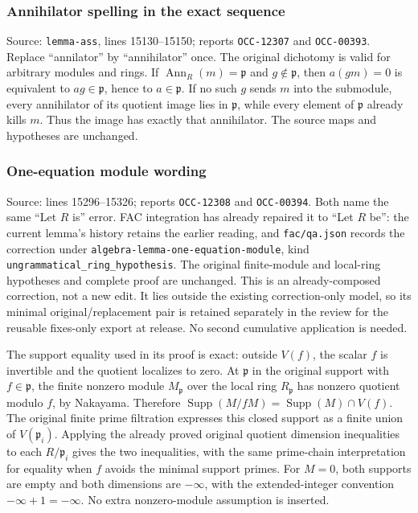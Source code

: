 \subsubsection{Annihilator spelling in the exact sequence}\label{algebra-proof-004-annihilator-spelling-in-the-exact-sequence}

Source: \texttt{lemma-ass}, lines 15130--15150; reports \texttt{OCC-12307} and \texttt{OCC-00393}. Replace ``annilator'' by ``annihilator'' once. The original dichotomy is valid for arbitrary modules and rings. If \(\operatorname{Ann}_R(m)=\mathfrak p\) and \(g\notin\mathfrak p\), then \(a(gm)=0\) is equivalent to \(ag\in\mathfrak p\), hence to \(a\in\mathfrak p\). If no such \(g\) sends \(m\) into the submodule, every annihilator of its quotient image lies in \(\mathfrak p\), while every element of \(\mathfrak p\) already kills \(m\). Thus the image has exactly that annihilator. The source maps and hypotheses are unchanged.

\subsubsection{One-equation module wording}\label{algebra-proof-004-one-equation-module-wording}

Source: lines 15296--15326; reports \texttt{OCC-12308} and \texttt{OCC-00394}. Both name the same ``Let \(R\) is'' error. FAC integration has already repaired it to ``Let \(R\) be'': the current lemma's history retains the earlier reading, and \texttt{fac/qa.json} records the correction under \texttt{algebra-lemma-one-equation-module}, kind \texttt{ungrammatical\_ring\_hypothesis}. The original finite-module and local-ring hypotheses and complete proof are unchanged. This is an already-composed correction, not a new edit. It lies outside the existing correction-only model, so its minimal original/replacement pair is retained separately in the review for the reusable fixes-only export at release. No second cumulative application is needed.

The support equality used in its proof is exact: outside \(V(f)\), the scalar \(f\) is invertible and the quotient localizes to zero. At \(\mathfrak p\) in the original support with \(f\in\mathfrak p\), the finite nonzero module \(M_{\mathfrak p}\) over the local ring \(R_{\mathfrak p}\) has nonzero quotient modulo \(f\), by Nakayama. Therefore \(\operatorname{Supp}(M/fM)=\operatorname{Supp}(M)\cap V(f)\). The original finite prime filtration expresses this closed support as a finite union of \(V(\mathfrak p_i)\). Applying the already proved original quotient dimension inequalities to each \(R/\mathfrak p_i\) gives the two inequalities, with the same prime-chain interpretation for equality when \(f\) avoids the minimal support primes. For \(M=0\), both supports are empty and both dimensions are \(-\infty\), with the extended-integer convention \(-\infty+1=-\infty\). No extra nonzero-module assumption is inserted.

